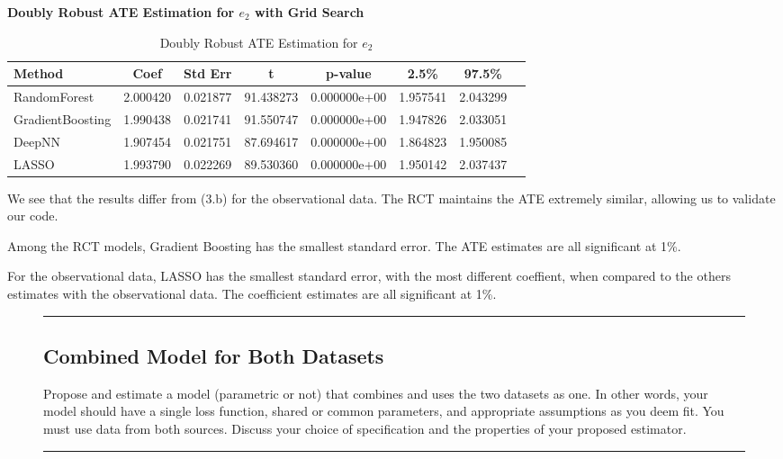\documentclass{article}
\newenvironment{colorparagraph}[1]{\par\color{#1}}{\par}
\begin{document}
\begin{table}[H]
  \textbf{Doubly Robust ATE Estimation for $e_2$ with Grid Search}
  \centering
  \renewcommand{\arraystretch}{1.5}
  \begin{tabular}{|l|c|c|c|c|c|c|c|}
    \hline
    \textbf{Method} & \textbf{Coef} & \textbf{Std Err} & \textbf{t} & \textbf{p-value} & \textbf{2.5\%} & \textbf{97.5\%} \\
    \hline
    RandomForest & 2.000420 & 0.021877 & 91.438273 & 0.000000e+00 & 1.957541 & 2.043299 \\ \hline
    GradientBoosting & 1.990438 & 0.021741 & 91.550747 & 0.000000e+00 & 1.947826 & 2.033051 \\ \hline
    DeepNN & 1.907454 & 0.021751 & 87.694617 & 0.000000e+00 & 1.864823 & 1.950085 \\ \hline
    LASSO & 1.993790 & 0.022269 & 89.530360 & 0.000000e+00 & 1.950142 & 2.037437 \\ \hline
  \end{tabular}
  \caption{Doubly Robust ATE Estimation for $e_2$}
\end{table}

We see that the results differ from (3.b) for the observational data. The RCT maintains the ATE extremely similar, allowing us to validate our code.

Among the RCT models, Gradient Boosting has the smallest standard error. The ATE estimates are all significant at 1\%.

For the observational data, LASSO has the smallest standard error, with the most different coeffient, when compared to the others estimates with the observational data. The coefficient estimates are all significant at 1\%.


\begin{figure}[H]
  \begin{colorparagraph}{questioncolor}
  \rule{\textwidth}{0.5pt}
  \label{q3e}
  \subsection{Combined Model for Both Datasets}

  Propose and estimate a model (parametric or not) that combines and uses the two datasets as one. In other words, your model should have a single loss function, shared or common parameters, and appropriate assumptions as you deem fit. You must use data from both sources. Discuss your choice of specification and the properties of your proposed estimator.

  \rule{\textwidth}{0.5pt}
  \end{colorparagraph}
\end{figure}
\end{document}

